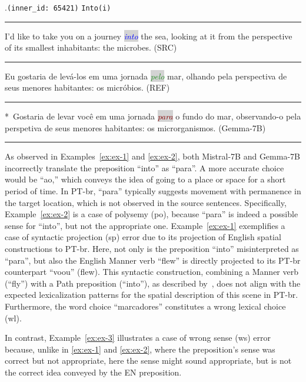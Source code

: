 \ex.\texttt{(inner\_id: 65421)} \hfill \texttt{Into(i)} \\[0.3ex] 
\noindent\rule{\linewidth}{0.9pt}
I'd like to take you on a journey \colorbox{lightgray}{\emph{\textcolor{blue}{into}}} the sea, looking at it from the perspective of its smallest inhabitants: the microbes. (SRC)\label{ex:ex-2} \\[-0.3ex]  
\noindent\rule{\linewidth}{0.3pt}
Eu gostaria de levá-los em uma jornada \colorbox{lightgray}{\emph{\textcolor{ForestGreen}{pelo}}} mar, olhando pela perspectiva de seus menores habitantes: os micróbios. (REF) \\[-0.3ex] 
\noindent\rule{\linewidth}{0.3pt}
*~Gostaria de levar você em uma jornada \colorbox{lightgray}{\emph{\textcolor{Maroon}{para}}} o fundo do mar, observando-o pela perspetiva de seus menores habitantes: os microrganismos. (Gemma-7B) \\[-0.3ex] 
\noindent\rule{\linewidth}{0.9pt}

As observed in Examples~\ref{ex:ex-1} and \ref{ex:ex-2}, both Mistral-7B and Gemma-7B incorrectly translate the preposition ``into'' as ``para''. A more accurate choice would be ``ao,'' which conveys the idea of going to a place or space for a short period of time. In PT-br, ``para'' typically suggests movement with permanence in the target location, which is not observed in the source sentences. Specifically, Example~\ref{ex:ex-2} is a case of polysemy (po), because ``para'' is indeed a possible sense for ``into'', but not the appropriate one. Example~\ref{ex:ex-1} exemplifies a case of syntactic projection (sp) error due to its projection of English spatial constructions to PT-br. Here, not only is the preposition ``into'' misinterpreted as ``para'', but also the English Manner verb ``flew'' is directly projected to its PT-br counterpart ``voou'' (flew). This syntactic construction, combining a Manner verb (``fly'') with a Path preposition (``into''), as described by~\textcite{Talmy00_2, slobin2005relating}, does not align with the expected lexicalization patterns for the spatial description of this scene in PT-br. Furthermore, the word choice ``marcadores'' constitutes a wrong lexical choice (wl).

In contrast, Example~\ref{ex:ex-3} illustrates a case of wrong sense (ws) error because, unlike in \ref{ex:ex-1} and \ref{ex:ex-2}, where the preposition's sense was correct but not appropriate, here the sense might sound appropriate, but is not the correct idea conveyed by the EN preposition.


